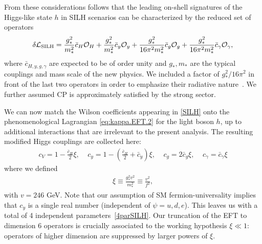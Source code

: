 From these considerations follows that the leading on-shell signatures of the Higgs-like state $h$ in SILH scenarios can be characterized by the reduced set of operators 
\begin{eqnarray}\label{SILH}
\delta{\cal L}_{\rm SILH}=\frac{g_*^2}{m_*^2}\bar c_H{\cal O}_H+\frac{g_*^2}{m_*^2} \bar c_y{\cal O}_y+\frac{g_*^2}{16\pi^2m_*^2}\bar c_g{\cal O}_g+\frac{g_*^2}{16\pi^2m_*^2}\bar c_\gamma{\cal O}_\gamma,
\end{eqnarray}
where $\bar c_{H,y,g,\gamma}$ are expected to be of order unity and $g_*, m_*$ are the typical couplings and mass scale of the new physics. We included a factor of ${g_*^2}/{16\pi^2}$ in front of the last two operators in order to emphasize their radiative nature~\cite{Giudice:2007fh}. %
We further assumed CP is approximately satisfied by the strong sector.

We can now match the Wilson coefficients appearing in \eqref{SILH} onto the phenomenological Lagrangian \eqref{eq:kappa.EFT.2} for the light boson $h$, up to additional interactions that are irrelevant to the present analysis. The resulting modified Higgs couplings are collected here:
\begin{eqnarray}\label{4parSILH}
c_V=1-\frac{\bar c_H}{2}\xi,~~~~~c_y=1-\left(\frac{\bar c_H}{2}+\bar c_y\right)\xi,~~~~~c_g=2 \bar c_g\xi,~~~~~c_\gamma=\bar c_\gamma\xi
\end{eqnarray}
where we defined 
\begin{eqnarray}\label{xi}
\xi\equiv\frac{g_*^2v^2}{m_*^2}\equiv\frac{v^2}{f^2},
\end{eqnarray}
with $v=246$ GeV.
Note that our assumption of SM fermion-universality implies that $c_y$ is a single real number (independent of $\psi=u,d,e$). This leaves us with a total of 4 independent parameters~\eqref{4parSILH}. Our truncation of the EFT to dimension 6 operators is crucially associated to the working hypothesis $\xi\ll1$: operators of higher dimension are suppressed by larger powers of $\xi$. 





